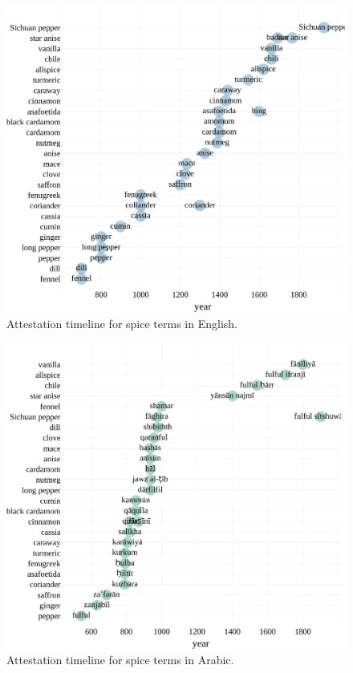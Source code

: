 \begin{figure}[!ht]
  \centering
  \includegraphics[width=\linewidth]{imgs/plots/attestation_en.pdf}
  \caption{Attestation timeline for spice terms in English.}
  \label{fig:attestation_en}
\end{figure}

\begin{figure}[!ht]
  \centering
  \includegraphics[width=\linewidth]{imgs/plots/attestation_ar.pdf}
  \caption{Attestation timeline for spice terms in Arabic.}
  \label{fig:attestation_ar}
\end{figure}

